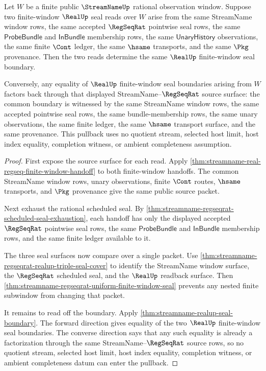 \begin{theorem}
\label{thm:streamname-regseqrat-realup-seal-pullback-uniqueness}
Let $W$ be a finite public $\StreamNameUp$ rational observation window. Suppose
two finite-window $\RealUp$ seal reads over $W$ arise from the same StreamName
window rows, the same accepted $\RegSeqRat$ pointwise seal rows, the same
$\mathsf{ProbeBundle}$ and $\mathsf{InBundle}$ membership rows, the same
$\mathsf{UnaryHistory}$ observations, the same finite $\Cont$ ledger, the same
$\hsame$ transports, and the same $\Pkg$ provenance. Then the two reads
determine the same $\RealUp$ finite-window seal boundary.

Conversely, any equality of $\RealUp$ finite-window seal boundaries arising
from $W$ factors back through that displayed StreamName--$\RegSeqRat$ source
surface: the common boundary is witnessed by the same StreamName window rows,
the same accepted pointwise seal rows, the same bundle-membership rows, the
same unary observations, the same finite ledger, the same $\hsame$ transport
surface, and the same provenance. This pullback uses no quotient stream,
selected host limit, host index equality, completion witness, or ambient
completeness assumption.
\end{theorem}
\begin{proof}
First expose the source surface for each read. Apply
\autoref{thm:streamname-real-regseq-finite-window-handoff} to both
finite-window handoffs. The common StreamName window rows, unary observations,
finite $\Cont$ routes, $\hsame$ transports, and $\Pkg$ provenance give the same
public source packet.

Next exhaust the rational scheduled seal. By
\autoref{thm:streamname-regseqrat-scheduled-seal-exhaustion}, each handoff has
only the displayed accepted $\RegSeqRat$ pointwise seal rows, the same
$\mathsf{ProbeBundle}$ and $\mathsf{InBundle}$ membership rows, and the same
finite ledger available to it.

The three seal surfaces now compare over a single packet. Use
\autoref{thm:streamname-regseqrat-realup-triple-seal-cover} to identify the
StreamName window surface, the $\RegSeqRat$ scheduled seal, and the $\RealUp$
readback surface. Then
\autoref{thm:streamname-regseqrat-uniform-finite-window-seal} prevents any
nested finite subwindow from changing that packet.

It remains to read off the boundary. Apply
\autoref{thm:streamname-realup-seal-boundary}. The forward direction gives
equality of the two $\RealUp$ finite-window seal boundaries. The converse
direction says that any such equality is already a factorization through the
same StreamName--$\RegSeqRat$ source rows, so no quotient stream, selected host
limit, host index equality, completion witness, or ambient completeness datum
can enter the pullback.
\end{proof}

